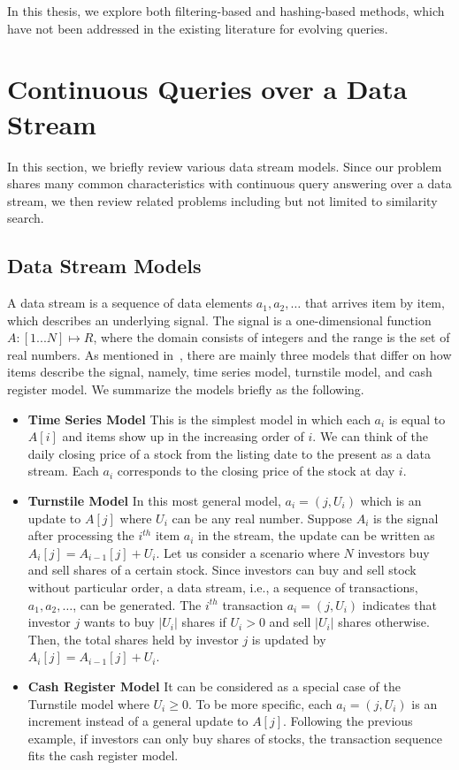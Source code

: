 In this thesis, we explore both filtering-based and hashing-based methods, which have not been addressed in the existing literature for evolving queries. 


\section{Continuous Queries over a Data Stream}
\label{sec:cont-topk}
In this section, we briefly review various data stream models. Since our problem shares many common characteristics with continuous query answering over a data stream, we then review related problems including but not limited to similarity search.  

\subsection{Data Stream Models}
A data stream is a sequence of data elements $a_1, a_2, \dots$ that arrives item by item, which describes an underlying signal. The signal is a one-dimensional function $A: [1...N] \mapsto R$, where the domain consists of integers and the range is the set of real numbers. As mentioned in~\cite{muthukrishnan05}, there are mainly three models that differ on how items describe the signal, namely, time series model, turnstile model, and cash register model. We summarize the models briefly as the following.  

\begin{itemize}
\item \textbf{Time Series Model} This is the simplest model in which each $a_i$ is equal to $A[i]$ and items show up in the increasing order of $i$. We can think of the daily closing price of a stock from the listing date to the present as a data stream. Each $a_i$ corresponds to the closing price of the stock at day $i$.          

\item \textbf{Turnstile Model} In this most general model, $a_i = (j, U_i)$ which is an update to $A[j]$ where $U_i$ can be any real number. Suppose $A_i$ is the signal after processing the $i^{th}$ item $a_i$ in the stream, the update can be written as $A_i[j] = A_{i-1}[j] + U_i$. Let us consider a scenario where $N$ investors buy and sell shares of a certain stock. Since investors can buy and sell stock without particular order, a data stream, i.e., a sequence of transactions, $a_1, a_2, \dots$, can be generated. The $i^{th}$ transaction $a_i = (j, U_i)$ indicates that investor $j$ wants to buy $|U_i|$ shares if $U_i > 0$ and sell $|U_i|$ shares otherwise. Then, the total shares held by investor $j$ is updated by $A_i[j] = A_{i-1}[j] + U_i$.       

\item \textbf{Cash Register Model} It can be considered as a special case of the Turnstile model where $U_i \geq 0$. To be more specific, each $a_i=(j, U_i)$ is an increment instead of a general update to $A[j]$. Following the previous example, if investors can only buy shares of stocks, the transaction sequence fits the cash register model. 

\end{itemize}


